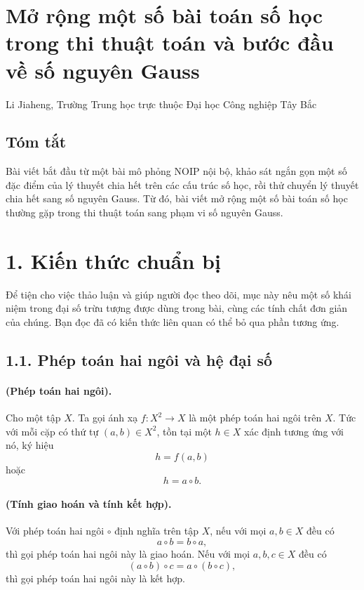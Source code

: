 \documentclass[11pt]{article}
\begin{document}
\clearpage
\section*{Mở rộng một số bài toán số học trong thi thuật toán và bước đầu về
số nguyên Gauss}

\begin{center}
Li Jiaheng, Trường Trung học trực thuộc Đại học Công nghiệp Tây Bắc
\end{center}

\subsection*{Tóm tắt}

Bài viết bắt đầu từ một bài mô phỏng NOIP nội bộ, khảo sát ngắn gọn một số
đặc điểm của lý thuyết chia hết trên các cấu trúc số học, rồi thử chuyển lý
thuyết chia hết sang số nguyên Gauss. Từ đó, bài viết mở rộng một số bài toán
số học thường gặp trong thi thuật toán sang phạm vi số nguyên Gauss.

\section*{1. Kiến thức chuẩn bị}

Để tiện cho việc thảo luận và giúp người đọc theo dõi, mục này nêu một số
khái niệm trong đại số trừu tượng được dùng trong bài, cùng các tính chất đơn
giản của chúng. Bạn đọc đã có kiến thức liên quan có thể bỏ qua phần tương
ứng.

\subsection*{1.1. Phép toán hai ngôi và hệ đại số}

\paragraph{ (Phép toán hai ngôi).}
Cho một tập \(X\). Ta gọi ánh xạ \(f:X^2\to X\) là một phép toán hai ngôi
trên \(X\). Tức với mỗi cặp có thứ tự \((a,b)\in X^2\), tồn tại một
\(h\in X\) xác định tương ứng với nó, ký hiệu
\[
  h=f(a,b)
\]
hoặc
\[
  h=a\circ b.
\]

\paragraph{ (Tính giao hoán và tính kết hợp).}
Với phép toán hai ngôi \(\circ\) định nghĩa trên tập \(X\), nếu với mọi
\(a,b\in X\) đều có
\[
  a\circ b=b\circ a,
\]
thì gọi phép toán hai ngôi này là giao hoán. Nếu với mọi \(a,b,c\in X\) đều
có
\[
  (a\circ b)\circ c=a\circ(b\circ c),
\tag{17}
\]
thì gọi phép toán hai ngôi này là kết hợp.
\end{document}
